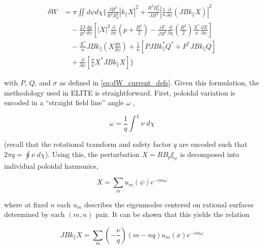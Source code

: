 \begin{equation}\label{eq:dW_ELITE}
 \begin{aligned}
  \delta W &= \pi \iint d\psi d\chi \Bigg\{ \frac{JB^2}{R^2 B_p^2} \left| k_\parallel X \right|^2 + \frac{R^2 B_p^2}{JB^2} \left| \frac{1}{n} \frac{\partial}{\partial \psi} \left( JB k_\parallel X \right) \right|^2\\
  &\quad- \frac{2J}{B^2} \frac{dp}{d\psi} \left[ \left| X \right|^2 \frac{\partial}{\partial \psi} \left( p + \frac{B^2}{2} \right) - \frac{iF}{JB^2} \frac{\partial}{\partial \chi} \left( \frac{B^2}{2} \right) \frac{X^*}{n} \frac{\partial X}{\partial \psi} \right]\\
  &\quad-\frac{X^*}{n} JBk_\parallel \left( X \frac{d\sigma}{d\psi} \right) + \frac{1}{n} \left[ PJBk_\parallel^* Q^* + P^* JBk_\parallel Q \right]\\
  &\quad+ \frac{\partial}{\partial \psi} \left[ \frac{\sigma}{n} X^* JBk_\parallel X \right] \Bigg\}
 \end{aligned}
\end{equation}

\noindent with $P$, $Q$, and $\sigma$ as defined in \cref{eq:dW_current_defs}.  Given this formulation, the methodology used in ELITE is straightforward.  First, poloidal variation is encoded in a ``straight field line'' angle $\omega$ \cite{Wilson1999},

\begin{equation}\label{eq:ELITE_angle}
 \omega = \frac{1}{q} \int^\chi \nu \;d\chi
\end{equation}

\noindent (recall that the rotational transform and safety factor $q$ are encoded such that $2\pi q = \oint \nu \;d\chi$).  Using this, the perturbation $X = RB_p \xi_\psi$ is decomposed into individual poloidal harmonics,

\begin{equation}\label{eq:ELITE_x}
 X = \sum_m u_m(\psi) e^{-im\omega}
\end{equation}

\noindent where at fixed $n$ each $u_m$ describes the eigenmodes centered on rational surfaces determined by each $(m,n)$ pair.  It can be shown \cite{Wilson2002} that this yields the relation

\begin{equation}\label{eq:ELITE_y}
 JBk_\parallel X = \sum_m \left(-\frac{\nu}{q}\right) \left(m-nq\right) u_m(x)e^{-im\omega}
\end{equation}


